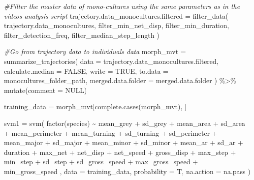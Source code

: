 \documentclass[
]{article}
\newenvironment{Shaded}{\begin{snugshade}}{\end{snugshade}}
\newcommand{\AttributeTok}[1]{\textcolor[rgb]{0.77,0.63,0.00}{#1}}
\newcommand{\CommentTok}[1]{\textcolor[rgb]{0.56,0.35,0.01}{\textit{#1}}}
\newcommand{\ConstantTok}[1]{\textcolor[rgb]{0.00,0.00,0.00}{#1}}
\newcommand{\FunctionTok}[1]{\textcolor[rgb]{0.00,0.00,0.00}{#1}}
\newcommand{\NormalTok}[1]{#1}
\newcommand{\OtherTok}[1]{\textcolor[rgb]{0.56,0.35,0.01}{#1}}
\newcommand{\SpecialCharTok}[1]{\textcolor[rgb]{0.00,0.00,0.00}{#1}}
\begin{document}
\begin{Shaded}
\begin{Highlighting}[]
  \CommentTok{\#Filter the master data of mono{-}cultures using the same parameters as in the videos analysis script}
\NormalTok{  trajectory.data\_monocultures.filtered }\OtherTok{=} \FunctionTok{filter\_data}\NormalTok{(}
\NormalTok{    trajectory.data\_monocultures,}
\NormalTok{    filter\_min\_net\_disp,}
\NormalTok{    filter\_min\_duration,}
\NormalTok{    filter\_detection\_freq,}
\NormalTok{    filter\_median\_step\_length}
\NormalTok{  )}
  
  \CommentTok{\#Go from trajectory data to individuals data}
\NormalTok{  morph\_mvt }\OtherTok{=} \FunctionTok{summarize\_trajectories}\NormalTok{(}
    \AttributeTok{data =}\NormalTok{ trajectory.data\_monocultures.filtered,}
    \AttributeTok{calculate.median =} \ConstantTok{FALSE}\NormalTok{,}
    \AttributeTok{write =} \ConstantTok{TRUE}\NormalTok{,}
    \AttributeTok{to.data =}\NormalTok{ monocultures\_folder\_path,}
    \AttributeTok{merged.data.folder =}\NormalTok{ merged.data.folder}
\NormalTok{  ) }\SpecialCharTok{\%\textgreater{}\%}
    \FunctionTok{mutate}\NormalTok{(}\AttributeTok{comment =} \ConstantTok{NULL}\NormalTok{)}
  
\NormalTok{  training\_data }\OtherTok{=}\NormalTok{ morph\_mvt[}\FunctionTok{complete.cases}\NormalTok{(morph\_mvt), ]}
  
\NormalTok{  svm1 }\OtherTok{=} \FunctionTok{svm}\NormalTok{(}
    \FunctionTok{factor}\NormalTok{(species) }\SpecialCharTok{\textasciitilde{}}
\NormalTok{      mean\_grey }\SpecialCharTok{+}
\NormalTok{      sd\_grey }\SpecialCharTok{+}
\NormalTok{      mean\_area }\SpecialCharTok{+}
\NormalTok{      sd\_area }\SpecialCharTok{+}
\NormalTok{      mean\_perimeter }\SpecialCharTok{+}
\NormalTok{      mean\_turning }\SpecialCharTok{+}
\NormalTok{      sd\_turning }\SpecialCharTok{+}
\NormalTok{      sd\_perimeter }\SpecialCharTok{+}
\NormalTok{      mean\_major }\SpecialCharTok{+}
\NormalTok{      sd\_major }\SpecialCharTok{+}
\NormalTok{      mean\_minor }\SpecialCharTok{+}
\NormalTok{      sd\_minor }\SpecialCharTok{+}
\NormalTok{      mean\_ar }\SpecialCharTok{+}
\NormalTok{      sd\_ar }\SpecialCharTok{+}
\NormalTok{      duration }\SpecialCharTok{+}
\NormalTok{      max\_net  }\SpecialCharTok{+}
\NormalTok{      net\_disp }\SpecialCharTok{+}
\NormalTok{      net\_speed }\SpecialCharTok{+}
\NormalTok{      gross\_disp }\SpecialCharTok{+}
\NormalTok{      max\_step }\SpecialCharTok{+}
\NormalTok{      min\_step }\SpecialCharTok{+}
\NormalTok{      sd\_step }\SpecialCharTok{+}
\NormalTok{      sd\_gross\_speed }\SpecialCharTok{+}
\NormalTok{      max\_gross\_speed }\SpecialCharTok{+}
\NormalTok{      min\_gross\_speed ,}
    \AttributeTok{data =}\NormalTok{ training\_data,}
    \AttributeTok{probability =}\NormalTok{ T,}
    \AttributeTok{na.action =}\NormalTok{ na.pass}
\NormalTok{  )}
  

\end{Highlighting}
\end{Shaded}
\end{document}
